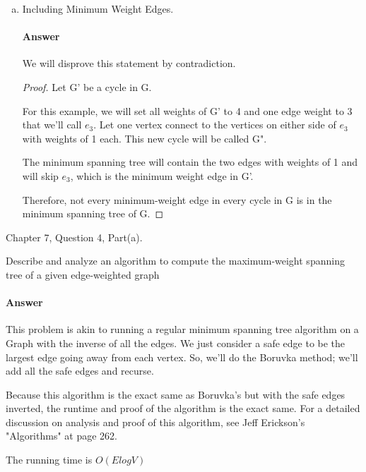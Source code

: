 \documentclass{article}
\begin{document}
\begin{enumerate}[(a)]
    \item Including Minimum Weight Edges.

        \paragraph{Answer}

        We will disprove this statement by contradiction.

        \begin{proof}
            Let G' be a cycle in G.

            For this example, we will set all weights of G' to 4 and one edge
            weight to 3 that we'll call $e_{3}$. Let one vertex connect to the vertices on either side
            of $e_{3}$ with weights of 1 each. This new cycle will be called G".

            The minimum spanning tree will contain the two edges with weights of 1
            and will skip $e_{3}$, which is the minimum weight edge in G'.

            Therefore, not every minimum-weight edge in every cycle in G is in
            the minimum spanning tree of G.
        \end{proof}

\end{enumerate}


\collab{}

Chapter 7, Question 4, Part(a).

Describe and analyze an algorithm to compute the maximum-weight
spanning tree of a given edge-weighted graph

\paragraph{Answer}

This problem is akin to running a regular minimum spanning tree algorithm on
a Graph with the inverse of all the edges. We just consider a safe edge to be
the largest edge going away from each vertex. So, we'll do the Boruvka method;
we'll add all the safe edges and recurse.

Because this algorithm is the exact same as Boruvka's but with the safe edges inverted,
the runtime and proof of the algorithm is the exact same. For a detailed discussion
on analysis and proof of this algorithm, see Jeff Erickson's "Algorithms" at page 262.

The running time is $O(E log V)$
\end{document}
